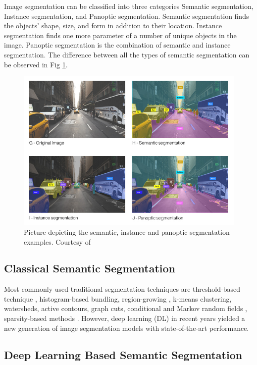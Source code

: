 	Image segmentation can be classified into three categories Semantic segmentation, Instance segmentation, and Panoptic segmentation. 
	Semantic segmentation finds the objects' shape, size, and form in addition to their location. Instance segmentation finds one more parameter of a number of unique objects in the image. Panoptic segmentation is the combination of semantic and instance segmentation. The difference between all the types of semantic segmentation can be observed in Fig \ref{fig:SS}.
    
    \begin{figure}[h]
    	\centering
    	\includegraphics[width=12cm]{images/ss.jpg}
    	\caption{Picture depicting the semantic, instance and panoptic segmentation examples. Courtesy of \cite{55_WinNT}}
    	\label{fig:SS}
    \end{figure}
    
    \subsection{Classical Semantic Segmentation}
    
	 Most commonly used traditional segmentation techniques are threshold-based technique \cite{56_otsu1979threshold}, histogram-based bundling, region-growing \cite{57_otsu1979threshold}, k-means clustering, watersheds, active contours, graph cuts, conditional and Markov random fields \cite{58_boykov2001fast}, sparsity-based methods \cite{59_starck2005image}. However, deep learning (DL) in recent years yielded a new generation of image segmentation models with state-of-the-art performance. 
    
    \subsection{Deep Learning Based Semantic Segmentation}
    

